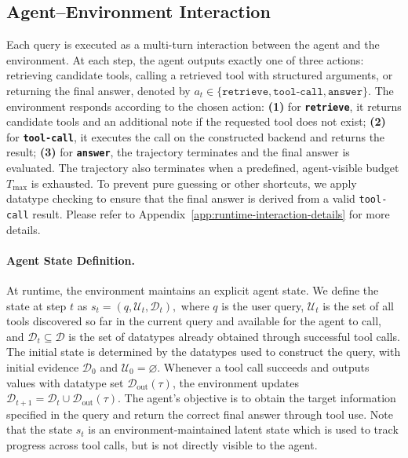 \subsection{Agent--Environment Interaction}

Each query is executed as a multi-turn interaction between the agent and the environment.
At each step, the agent outputs exactly one of three actions:
retrieving candidate tools, calling a retrieved tool with structured arguments, or returning the final answer, denoted by
$a_t \in \{\texttt{retrieve}, \texttt{tool-call}, \texttt{answer}\}$.
The environment responds according to the chosen action:
\textbf{(1)} for \textbf{\texttt{retrieve}}, it returns candidate tools and an additional note if the requested tool does not exist;
\textbf{(2)} for \textbf{\texttt{tool-call}}, it executes the call on the constructed backend and returns the result;
\textbf{(3)} for \textbf{\texttt{answer}}, the trajectory terminates and the final answer is evaluated.
The trajectory also terminates when a predefined, agent-visible budget $T_{\max}$ is exhausted.
To prevent pure guessing or other shortcuts, we apply datatype checking to ensure that the final answer is derived from a valid \texttt{tool-call} result. 
Please refer to Appendix~\ref{app:runtime-interaction-details} for more details.

\paragraph{Agent State Definition.} At runtime, the environment maintains an explicit agent state. 
We define the state at step $t$ as $s_t = (q, \mathcal{U}_t, \mathcal{D}_t),$ where $q$ is the user query, $\mathcal{U}_t$ is the set of all tools discovered so far in the current query and available for the agent to call, and $\mathcal{D}_t \subseteq \mathcal{D}$ is the set of datatypes already obtained through successful tool calls. 
The initial state is determined by the datatypes used to construct the query, with initial evidence $\mathcal{D}_0$ and $\mathcal{U}_0=\varnothing$. 
Whenever a tool call succeeds and outputs values with datatype set $\mathcal{D}_{\mathrm{out}}(\tau)$, the environment updates $\mathcal{D}_{t+1}=\mathcal{D}_t \cup \mathcal{D}_{\mathrm{out}}(\tau)$.
The agent's objective is to obtain the target information specified in the query and return the correct final answer through tool use.
Note that the state $s_t$ is an environment-maintained latent state which is used to track progress across tool calls, but is not directly visible to the agent.

